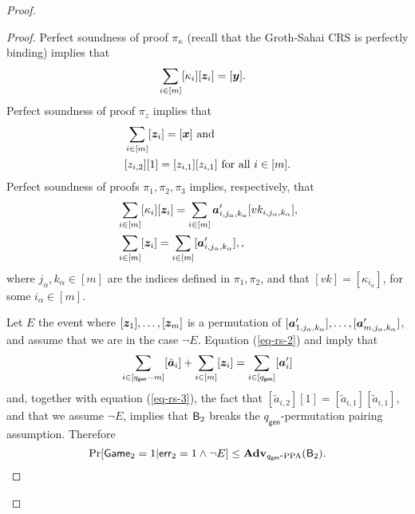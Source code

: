 \begin{proof}
\begin{proof}
Perfect soundness of proof $\pi_\kappa$  (recall that the Groth-Sahai CRS is perfectly binding)  implies that
\begin{align*}
&\sum_{i\in[m]}[\kappa_i][{\boldsymbol{z}}_i]=[{\boldsymbol{y}}].
\end{align*}
Perfect soundness of proof $\pi_z$ implies that
\begin{align}
&\sum_{i\in[m]}[{\boldsymbol{z}}_i]=[{\boldsymbol{x}}]\text{ and}\nonumber\\
&[z_{i,2}][1]=[z_{i,1}][z_{i,1}] \text{ for all }i\in[m].\label{eq-rs-3}
\end{align}
Perfect soundness of proofs $\pi_1,\pi_2,\pi_3$ implies, respectively, that
\begin{align}
&\sum_{i\in[m]}[\kappa_i][{\boldsymbol{z}}_i]=\sum_{i\in[m]}{\boldsymbol{a}}'_{i,j_\alpha,k_\alpha}[vk_{i,j_\alpha,k_\alpha}],\label{eq-rs-1}\\
&\sum_{i\in[m]}[{\boldsymbol{z}}_i]=\sum_{i\in[m]}[{\boldsymbol{a}}'_{i,j_\alpha,k_\alpha}], \label{eq-rs-2},
\end{align}
where $j_\alpha,k_\alpha\in[m]$ are the indices defined in $\pi_1,\pi_2$, and that $[vk]=[\kappa_{i_\alpha}]$, for some $i_\alpha\in[m]$.

Let $E$ the event where $[{\boldsymbol{z}}_1],\ldots,[{\boldsymbol{z}}_m]$ is a permutation of $[{\boldsymbol{a}}'_{1,j_\alpha,k_\alpha}],\allowbreak\ldots,\allowbreak[{\boldsymbol{a}}'_{m,j_\alpha,k_\alpha}]$, and assume that we are in the case $\neg E$.
Equation (\ref{eq-rs-2}) and imply that
$$
\sum_{i\in[{q_\mathsf{gen}}-m]}[\tilde{{\boldsymbol{a}}}_i]+\sum_{i\in[m]}[{\boldsymbol{z}}_i] = \sum_{i\in[{q_\mathsf{gen}}]}[{\boldsymbol{a}}'_i]
$$
and, together with equation (\ref{eq-rs-3}), the fact that $[\tilde{a}_{i,2}][1]=[\tilde{a}_{i,1}][\tilde{a}_{i,1}]$, and that we assume $\neg E$, implies that 
$\mathsf{B}_2$ breaks the ${q_\mathsf{gen}}$-permutation pairing assumption. Therefore
$$\Pr[\mathsf{Game}_2=1|\mathsf{err}_2=1 \wedge\neg E]\leq\mathbf{Adv}_{{q_\mathsf{gen}}\mbox{-}\mathrm{PPA}}(\mathsf{B}_2).$$


\end{proof}
\end{proof}
